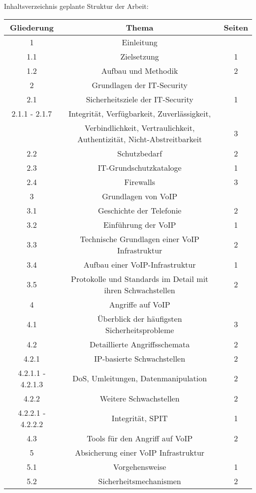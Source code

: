 \documentclass[a4paper,11pt,ngerman]{INSOexpose}
\begin{document}
\begin{section}{Inhaltsverzeichnis}
geplante Struktur der Arbeit:
\\
\renewcommand{\arraystretch}{2.2}
\begin{longtable}{c|c|c}
\textbf{Gliederung} & \textbf{Thema} & \textbf{Seiten} \\ 
\hline 

1 & Einleitung & \\ 
1.1 & Zielsetzung & 1 \\ 
1.2 & Aufbau und Methodik & 2 \\ 
2 & Grundlagen der IT-Security &  \\ 
2.1 & Sicherheitsziele der IT-Security & 1 \\ 
2.1.1 - 2.1.7 & Integrität, Verfügbarkeit, Zuverlässigkeit, & \\
 & Verbindlichkeit, Vertraulichkeit, Authentizität, Nicht-Abstreitbarkeit & 3 \\ 
2.2 & Schutzbedarf & 2 \\ 
2.3 & IT-Grundschutzkataloge & 1 \\ 
2.4 & Firewalls & 3 \\ 
3 & Grundlagen von VoIP &  \\ 
3.1 & Geschichte der Telefonie & 2 \\ 
3.2 & Einführung der VoIP & 1 \\ 
3.3 & Technische Grundlagen einer VoIP Infrastruktur & 2 \\ 
3.4 & Aufbau einer VoIP-Infrastruktur & 1 \\ 
3.5 & Protokolle und Standards im Detail mit ihren Schwachstellen & 2 \\ 
4 & Angriffe auf VoIP &  \\ 
4.1 & Überblick der häufigsten Sicherheitsprobleme & 3 \\ 
4.2 & Detaillierte Angriffsschemata & 2 \\ 
4.2.1 & IP-basierte Schwachstellen & 2 \\ 
4.2.1.1 - 4.2.1.3 & DoS, Umleitungen, Datenmanipulation & 2 \\ 
4.2.2 & Weitere Schwachstellen & 2 \\ 
4.2.2.1 - 4.2.2.2 & Integrität, SPIT & 1 \\ 
4.3 & Tools für den Angriff auf VoIP & 2 \\ 
5 & Absicherung einer VoIP Infrastruktur &  \\ 
5.1 & Vorgehensweise & 1 \\ 
5.2 & Sicherheitsmechanismen & 2 \\ 

\end{longtable}
\end{section}
\end{document}
